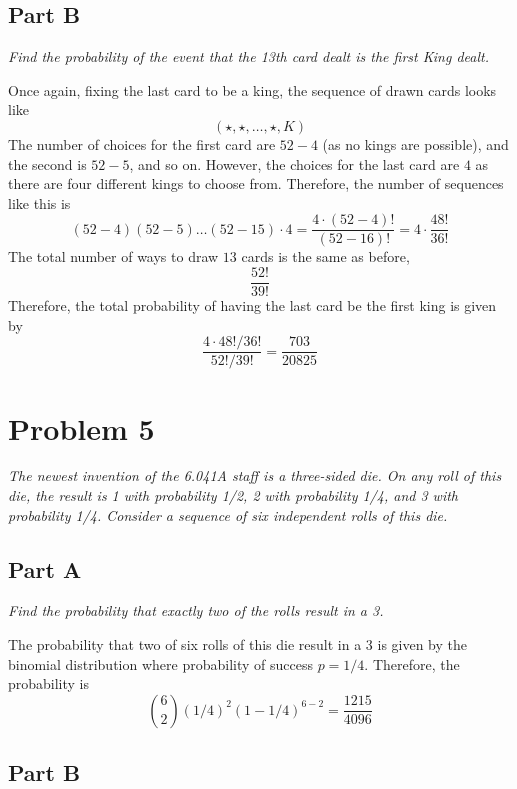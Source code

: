 \documentclass{article}
\begin{document}
\subsection*{Part B}

\textit{Find the probability of the event that the 13th card dealt is the
first King dealt.}

\bigbreak

Once again, fixing the last card to be a king, the sequence of drawn cards
looks like
$$ ( \star, \star, \ldots, \star, K) $$
The number of choices for the first card are $ 52 - 4 $ (as no kings are
possible), and the second is $ 52 - 5 $, and so on. However, the choices for
the last card are $ 4 $ as there are four different kings to choose from.
Therefore, the number of sequences like this is
$$ (52 - 4) (52 - 5) \ldots (52 - 15) \cdot 4 = \frac{4 \cdot (52 - 4)!}{(52
- 16)!} = 4 \cdot \frac{48!}{36!} $$
The total number of ways to draw $ 13 $ cards is the same as before,
$$ \frac{52!}{39!} $$
Therefore, the total probability of having the last card be the first king is
given by
$$ \frac{ 4 \cdot 48! / 36!}{52! / 39!} = \frac{703}{20825} $$

\section*{Problem 5}

\textit{The newest invention of the 6.041A staff is a three-sided die. On any
roll of this die, the result is 1 with probability 1/2, 2 with probability
1/4, and 3 with probability 1/4. Consider a sequence of six independent rolls
of this die.}

\subsection*{Part A}

\textit{Find the probability that exactly two of the rolls result in a 3.}

\bigbreak

The probability that two of six rolls of this die result in a 3 is given by
the binomial distribution where probability of success $ p = 1/4 $. Therefore,
the probability is
$$ \binom{6}{2} (1/4)^2 (1 - 1/4)^{6 - 2} = \frac{1215}{4096} $$

\subsection*{Part B}
\end{document}
